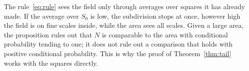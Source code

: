 The rule~\eqref{eq:rule} sees the field only through averages over squares it has already made. If
the average over $S_0$ is low, the subdivision stops at once, however high the field is on fine
scales inside, while the area sees all scales. Given a large area, the proposition rules out that
$N$ is comparable to the area with conditional probability tending to one; it does not rule out a
comparison that holds with positive conditional probability. This is why the proof of
Theorem~\ref{thm:tail} works with the squares directly.
